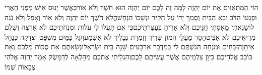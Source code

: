 \documentclass[../main/main.tex]{subfiles}
\begin{document}
\begin{multicols}{\ncols}
הוֹי הַמִּתְאַוִּים אֶת יוֹם יַהְוֶה לָמָּה זֶּה לָכֶם יוֹם יַהְוֶה הוּא חֹשֶׁךְ וְלֹא אוֹר\PreVerseSpace{}כַּאֲשֶׁר יָנוּס אִישׁ מִפְּנֵי הָאֲרִי וּפְגָעוֹ הַדֹּב וּבָא הַבַּיִת וְסָמַךְ יָדוֹ עַל הַקִּיר וּנְשָׁכוֹ הַנָּחָשׁ\PreVerseSpace{}הֲלֹא חֹשֶׁךְ יוֹם יַהְוֶה וְלֹא אוֹר וְאָפֵל וְלֹא נֹגַהּ לוֹ\PreVerseSpace{}שָׂנֵאתִי מָאַסְתִּי חַגֵּיכֶם וְלֹא אָרִיחַ בְּעַצְּרֹתֵיכֶם\PreVerseSpace{}כִּי אִם תַּעֲלוּ לִי עֹלוֹת וּמִנְחֹתֵיכֶם לֹא אֶרְצֶה וְשֶׁלֶם מְרִיאֵיכֶם לֹא אַבִּיט\PreVerseSpace{}הָסֵר מֵעָלַי הֲמוֹן שִׁרֶיךָ וְזִמְרַת נְבָלֶיךָ לֹא אֶשְׁמָע\PreVerseSpace{}וְיִגַּל כַּמַּיִם מִשְׁפָּט וּצְדָקָה כְּנַחַל אֵיתָן\PreVerseSpace{}הַזְּבָחִים וּמִנְחָה הִגַּשְׁתֶּם לִי בַמִּדְבָּר אַרְבָּעִים שָׁנָה בֵּית יִשְׂרָאֵל\PreVerseSpace{}וּנְשָׂאתֶם אֵת סֻכּוֹת\SubEnd{} מִלְכֹּם\SubEnd{} וְאֵת כּוֹכַב אֱלֹהֵיכֶם כֵּיוָן צַלְמֵיהֶם\SubEnd{} אֲשֶׁר עֲשִׂיתֶם לָכֶם\PreVerseSpace{}וְהִגְלֵיתִי אֶתְכֶם מֵהָלְאָה לְדַמָּשֶׂק אָמַר יַהְוֶה אֱלֹהֵי צְבָאוֹת שְׁמוֹ\OpenSection{}\par

\end{multicols}
\end{document}
